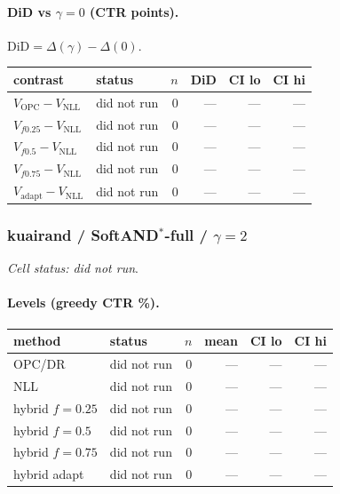 \documentclass[10pt,a4paper]{article}
\begin{document}
\paragraph{DiD vs $\gamma=0$ (CTR points).} $\mathrm{DiD}=\Delta(\gamma)-\Delta(0)$.
{\centering\small\begin{tabular}{llrrrr}
\toprule contrast & status & $n$ & DiD & CI lo & CI hi \\
\midrule
$V_{\mathrm{OPC}}-V_{\mathrm{NLL}}$ & did not run & 0 & --- & --- & --- \\
$V_{f0.25}-V_{\mathrm{NLL}}$ & did not run & 0 & --- & --- & --- \\
$V_{f0.5}-V_{\mathrm{NLL}}$ & did not run & 0 & --- & --- & --- \\
$V_{f0.75}-V_{\mathrm{NLL}}$ & did not run & 0 & --- & --- & --- \\
$V_{\mathrm{adapt}}-V_{\mathrm{NLL}}$ & did not run & 0 & --- & --- & --- \\
\bottomrule\end{tabular}\par}
\bigskip
\subsubsection{kuairand / SoftAND$^*$-full / $\gamma=2$}
\emph{Cell status: did not run}.
\paragraph{Levels (greedy CTR \%).}
{\centering\small\begin{tabular}{llrrrr}
\toprule method & status & $n$ & mean & CI lo & CI hi \\
\midrule
OPC/DR & did not run & 0 & --- & --- & --- \\
NLL & did not run & 0 & --- & --- & --- \\
hybrid $f{=}0.25$ & did not run & 0 & --- & --- & --- \\
hybrid $f{=}0.5$ & did not run & 0 & --- & --- & --- \\
hybrid $f{=}0.75$ & did not run & 0 & --- & --- & --- \\
hybrid adapt & did not run & 0 & --- & --- & --- \\
\bottomrule\end{tabular}\par}
\end{document}

